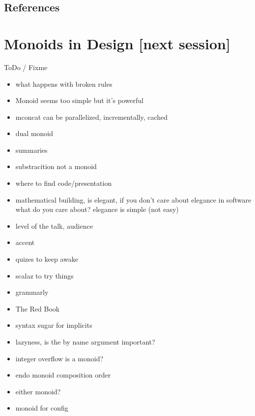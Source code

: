 \documentclass{beamer}
\begin{document}
\subsection{References}

\section{Monoids in Design \color[rgb]{0.5,0.1,0.9}[next session]}









\begin{frame}{ToDo / Fixme}
  \begin{itemize}
    \item what happens with broken rules
    \item Monoid seems too simple but it's powerful
    \item mconcat can be parallelized, incrementally, cached
    \item dual monoid
    \item summaries
      \item substracition not a monoid
      \item where to find code/presentation
        \item mathematical building, is elegant, if you don't care about
          elegance in software what do you care about? elegance is simple (not easy)
    \item level of the talk, audience
    \item accent
    \item quizes to keep awake
      \item scalaz to try things
        \item grammarly
          \item The Red Book
            \item syntax sugar for implicits
              \item lazyness, is the by name argument important?
                \item integer overflow is a monoid?
                  \item endo monoid composition order
                  \item either monoid?
                    \item monoid for config
  \end{itemize}
\end{frame}
\end{document}
